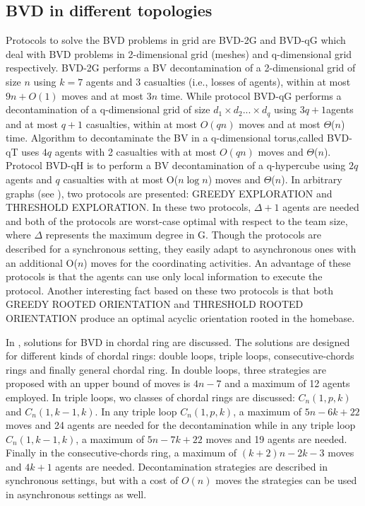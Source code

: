 \subsection{BVD in different topologies}
Protocols to solve the  BVD problems in grid are BVD-2G and BVD-qG which deal with BVD problems in 2-dimensional grid (meshes) and q-dimensional grid respectively. BVD-2G performs a BV decontamination of a 2-dimensional grid of size $n$ using $k=7$ agents and 3 casualties (i.e., losses of agents), within at most $9n+O(1)$ moves and at most $3n$ time. While protocol BVD-qG performs a decontamination of a q-dimensional grid of size $d_1\times d_2 ...\times d_q$ using $3q+1$agents and at most $q+1$ casualties, within at most $O(qn)$ moves and at most $\Theta$($n$) time. Algorithm to decontaminate the BV in a q-dimensional torus,called BVD-qT uses $4q$ agents with 2 casualties with at most $O(qn)$ moves and $\Theta$($n$). Protocol BVD-qH is to perform a BV decontamination of a q-hypercube using $2q$ agents and $q$ casualties with at most O($n\log n$) moves and $\Theta$($n$). In arbitrary graphs (see \cite{Cai1}), two protocols are presented: GREEDY EXPLORATION and THRESHOLD EXPLORATION. In these two protocols, $\Delta +1$ agents are needed and both of the protocols are worst-case optimal with respect to the team size, where $\Delta$ represents the maximum degree in G. Though the protocols are described for a synchronous setting, they easily adapt to asynchronous ones with an additional O($n$) moves for the coordinating activities. An advantage of these protocols is that the agents can use only local information to execute the protocol. Another interesting fact based on these two protocols is that both GREEDY ROOTED ORIENTATION and THRESHOLD ROOTED ORIENTATION produce an optimal acyclic orientation rooted in the homebase.

In \cite{Alotaibi}, solutions for BVD in chordal ring are discussed. The solutions are designed for  different kinds of chordal rings: double loops, triple loops, consecutive-chords rings and finally general chordal ring. In double loops,     three strategies  are proposed  
with an  upper bound of moves is $4n-7$  and a maximum of 12 agents   employed.
In triple loops,  wo classes of chordal rings are discussed: $C_n(1,p,k)$  and $C_n(1,k-1,k)$. In any triple loop $C_n(1,p,k)$, a maximum of $5n-6k+22$ moves and 24 agents are needed for the decontamination while in any triple loop $C_n(1,k-1,k)$, a maximum of $5n-7k+22$ moves and 19 agents are needed. Finally in the consecutive-chords ring, a maximum of $(k+2)n-2k-3$ moves and $4k+1$ agents are needed. Decontamination strategies  are described  in synchronous settings, but   with a cost of $O(n)$ moves   the strategies can be used in asynchronous settings as well.







 









